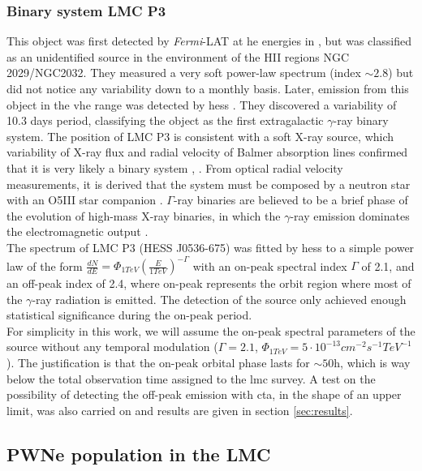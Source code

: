 \documentclass[main.tex]{subfiles}
\begin{document}
\subsubsection{Binary system LMC P3}

This object was first detected by \textit{Fermi}-LAT at \gls{he} energies in \cite{2016LMCFermiLAT}, but was classified as an unidentified source in the environment of the HII regions NGC 2029/NGC2032. They measured a very soft power-law spectrum (index $\sim 2.8$) but did not notice any variability down to a monthly basis.
Later, emission from this object in the \gls{vhe} range was detected by \gls{hess} \cite{2017HESSLMCP3}. They discovered a variability of 10.3 days period, classifying the object as the first extragalactic $\gamma$-ray binary system. The position of LMC P3 is consistent with a soft X-ray source, which variability of X-ray flux and radial velocity of Balmer absorption lines confirmed that it is very likely a binary system \cite{1981softXraysLMC}, \cite{2012xraybinaryP3}. From optical radial velocity measurements, it is derived that the system must be composed by a neutron star with an O5III star companion \cite{2016P3binary}. $\Gamma$-ray binaries are believed to be a brief phase of the evolution of high-mass X-ray binaries, in which the $\gamma$-ray emission dominates the electromagnetic output \cite{1989binaries}.\\
The spectrum of LMC P3 (HESS J0536-675) was fitted by \gls{hess} to a simple power law of the form $\frac{dN}{dE} = \Phi_{1TeV}\left( \frac{E}{1TeV}\right)^{-\Gamma}$ with an on-peak spectral index $\Gamma$ of 2.1, and an off-peak index of 2.4, where on-peak represents the orbit region where most of the $\gamma$-ray radiation is emitted. The detection of the source only achieved enough statistical significance during the on-peak period.\\
For simplicity in this work, we will assume the on-peak spectral parameters of the source without any temporal modulation ($\Gamma=2.1$, $\Phi_{1TeV} = 5 \cdot 10^{-13}cm^{-2}s^{-1}TeV^{-1}$). The justification is that the on-peak orbital phase lasts for $\sim 50$h, which is way below the total observation time assigned to the \gls{lmc} survey. A test on the possibility of detecting the off-peak emission with \gls{cta}, in the shape of an upper limit, was also carried on and results are given in section \ref{sec:results}.

\subsection{PWNe population in the LMC}\label{sec:pwnepop}
\end{document}
